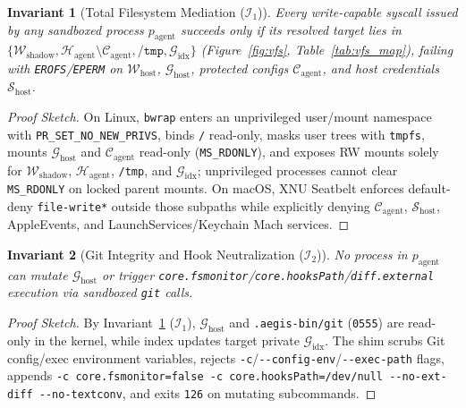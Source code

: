 \documentclass[10pt,journal,compsoc]{IEEEtran}
\newtheorem{invariant}{Invariant}
\begin{document}
\begin{invariant}[Total Filesystem Mediation ($\mathcal{I}_1$)]
\label{inv:fs}
Every write-capable syscall issued by any sandboxed process $p_{\text{agent}}$ succeeds only if its resolved target lies in $\{\mathcal{W}_{\text{shadow}}, \mathcal{H}_{\text{agent}} \setminus \mathcal{C}_{\text{agent}}, \texttt{/tmp}, \mathcal{G}_{\text{idx}}\}$ (Figure~\ref{fig:vfs}, Table~\ref{tab:vfs_map}), failing with \texttt{EROFS}/\texttt{EPERM} on $\mathcal{W}_{\text{host}}$, $\mathcal{G}_{\text{host}}$, protected configs $\mathcal{C}_{\text{agent}}$, and host credentials $\mathcal{S}_{\text{host}}$.
\end{invariant}
\begin{proof}[Proof Sketch]
On Linux, \texttt{bwrap} enters an unprivileged user/mount namespace with \texttt{PR\_SET\_NO\_NEW\_PRIVS}, binds \texttt{/} read-only, masks user trees with \texttt{tmpfs}, mounts $\mathcal{G}_{\text{host}}$ and $\mathcal{C}_{\text{agent}}$ read-only (\texttt{MS\_RDONLY}), and exposes RW mounts solely for $\mathcal{W}_{\text{shadow}}$, $\mathcal{H}_{\text{agent}}$, \texttt{/tmp}, and $\mathcal{G}_{\text{idx}}$; unprivileged processes cannot clear \texttt{MS\_RDONLY} on locked parent mounts. On macOS, XNU Seatbelt enforces default-deny \texttt{file-write*} outside those subpaths while explicitly denying $\mathcal{C}_{\text{agent}}$, $\mathcal{S}_{\text{host}}$, AppleEvents, and LaunchServices/Keychain Mach services.
\end{proof}

\begin{invariant}[Git Integrity and Hook Neutralization ($\mathcal{I}_2$)]
\label{inv:git}
No process in $p_{\text{agent}}$ can mutate $\mathcal{G}_{\text{host}}$ or trigger \texttt{core.fsmonitor}/\texttt{core.hooksPath}/\texttt{diff.external} execution via sandboxed \texttt{git} calls.
\end{invariant}
\begin{proof}[Proof Sketch]
By Invariant~\ref{inv:fs} ($\mathcal{I}_1$), $\mathcal{G}_{\text{host}}$ and \texttt{.aegis-bin/git} (\texttt{0555}) are read-only in the kernel, while index updates target private $\mathcal{G}_{\text{idx}}$. The shim scrubs Git config/exec environment variables, rejects \texttt{-c}/\texttt{-\/-config-env}/\texttt{-\/-exec-path} flags, appends \texttt{-c core.fsmonitor=false -c core.hooksPath=/dev/null -\/-no-ext-diff -\/-no-textconv}, and exits \texttt{126} on mutating subcommands.
\end{proof}
\end{document}
